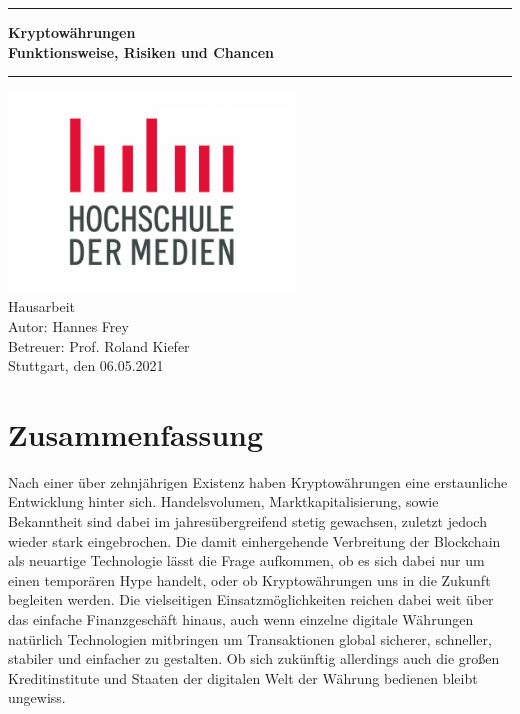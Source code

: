 \documentclass[12pt,oneside]{article}
\newcommand{\JMUTitle}[9]{

  \thispagestyle{empty}
  \vspace*{\stretch{1}}
  {\parindent0cm
  \rule{\linewidth}{.7ex}}
  \begin{flushright}
    \vspace*{\stretch{1}}
    \sffamily\bfseries\Huge
    #1\\
    \vspace*{\stretch{1}}
    \sffamily\bfseries\large
    #2
    \vspace*{\stretch{1}}
  \end{flushright}
  \rule{\linewidth}{.7ex}

  \vspace*{\stretch{1}}
  \begin{center}
    \includegraphics[width=3in]{logo} \\
    \vspace*{\stretch{1}}
    \Large Hausarbeit  \\

    \vspace*{\stretch{2}}
   \large Autor: #7 \\
    \vspace*{\stretch{1}}
    \large Betreuer: #6 \\[1mm]
    
    \vspace*{\stretch{1}}
    \large Stuttgart, den #5
  \end{center}
}
\begin{document}
  \JMUTitle
      {Kryptowährungen}        					%
      {Funktionsweise, Risiken und Chancen}     %
      {Fakultät Druck und Medien}  				%
      {Stuttgart 2021}                          %
      {06.05.2021}                              %
      {Prof. Roland Kiefer}               		%
      {Hannes Frey}                         	%
      {Pr"ufungsdatum}                          %

  \clearpage

\lhead{}
    \setcounter{page}{1}

\tableofcontents
\clearpage

\listoffigures

\clearpage

\section*{Zusammenfassung}

Nach einer über zehnjährigen Existenz haben Kryptowährungen eine erstaunliche Entwicklung hinter sich. Handelsvolumen, Marktkapitalisierung, sowie Bekanntheit sind dabei im jahresübergreifend stetig gewachsen, zuletzt jedoch wieder stark eingebrochen. Die damit einhergehende Verbreitung der Blockchain als neuartige Technologie lässt die Frage aufkommen, ob es sich dabei nur um einen temporären Hype handelt, oder ob Kryptowährungen uns in die Zukunft begleiten werden. Die vielseitigen Einsatzmöglichkeiten reichen dabei weit über das einfache Finanzgeschäft hinaus, auch wenn einzelne digitale Währungen natürlich Technologien mitbringen um Transaktionen global sicherer, schneller, stabiler und einfacher zu gestalten. Ob sich zukünftig allerdings auch die großen Kreditinstitute und Staaten der digitalen Welt der Währung bedienen bleibt ungewiss.


\clearpage

\end{document}
